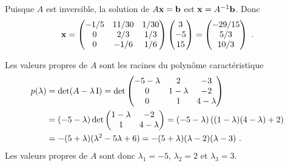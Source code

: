 { Puisque $A$ est inversible, la solution
de $A\mathbf{x} = \mathbf{b}$ est $\mathbf{x} = A^{-1}\mathbf{b}$.  Donc
\[
\mathbf{x} = 
\begin{pmatrix}
-1/5 & 11/30 & 1/30 \\ 0 & 2/3 & 1/3 \\ 0 & -1/6 & 1/6
\end{pmatrix}
\begin{pmatrix} 3 \\ -5 \\ 15 \end{pmatrix}
= \begin{pmatrix} -29/15 \\ 5/3 \\ 10/3 \end{pmatrix} \ .
\]

 Les valeurs propres de $A$ sont les racines du polynôme
caractéristique
\begin{align*}
p(\lambda) &= \det(A -\lambda \operatorname{I})
=\det \begin{pmatrix}
-5-\lambda & 2 & -3 \\ 0 & 1-\lambda & -2 \\ 0 & 1 & 4-\lambda
\end{pmatrix} \\
&=(-5-\lambda) \det \begin{pmatrix} 1-\lambda & -2 \\  1 & 4-\lambda
\end{pmatrix}
=(-5-\lambda)\left( (1-\lambda)(4-\lambda)+2\right) \\
&= -(5+\lambda)(\lambda^2 -5\lambda +6)
= -(5+\lambda)(\lambda -2)(\lambda -3) \ .
\end{align*}
Les valeurs propres de $A$ sont donc $\lambda_1 = -5$, $\lambda_2 = 2$
et $\lambda_3 = 3$.

}

